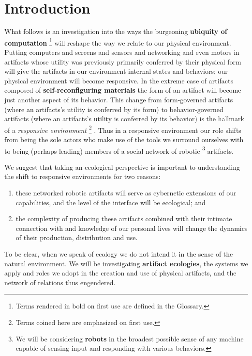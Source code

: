 \chapter{Introduction}
\label{ch:intro}
%
What follows is an investigation into the ways the burgeoning \textbf{ubiquity of computation}%
\footnote{Terms rendered in bold on first use are defined in the Glossary.}
will reshape the way we relate to our physical environment.
Putting computers and screens and sensors and networking and even motors in artifacts whose utility was previously primarily conferred by their physical form will give the artifacts in our environment internal states and behaviors; our physical environment will become responsive.
In the extreme case of artifacts composed of \textbf{self-reconfiguring materials} the form of an artifact will become just another aspect of its behavior.
This change from form-governed artifacts (where an artifacts's utility is conferred by its form) to behavior-governed artifacts (where an artifacts's utility is conferred by its behavior) is the hallmark of a \emph{responsive environment}%
\footnote{Terms coined here are emphasized on first use.}%
.
Thus in a responsive environment our role shifts from being the sole actors who make use of the tools we surround ourselves with to being (perhaps leading) members of a social network of robotic%
\footnote{We will be considering \textbf{robots} in the broadest possible sense of any machine capable of sensing input and responding with various behaviors.}
artifacts.

We suggest that taking an ecological perspective is important to understanding the shift to responsive environments for two reasons:
\begin{enumerate}
\item these networked robotic artifacts will serve as cybernetic extensions of our capabilities, and the level of the interface will be ecological; and
\item the complexity of producing these artifacts combined with their intimate connection with and knowledge of our personal lives will change the dynamics of their production, distribution and use.
\end{enumerate}
To be clear, when we speak of ecology we do not intend it in the sense of the natural environment.
We will be investigating \textbf{artifact ecologies}, the systems we apply and roles we adopt in the creation and use of physical artifacts, and the network of relations thus engendered.

